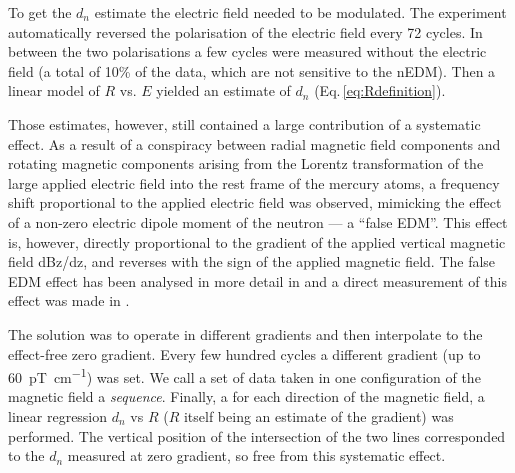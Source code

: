 To get the $d_n$ estimate the electric field needed to be modulated. The experiment automatically reversed the polarisation of the electric field every 72 cycles. In between the two polarisations a few cycles were measured without the electric field (a total of 10\% of the data, which are not sensitive to the nEDM). Then a linear model of  $R$ vs. $E$ yielded an estimate of $d_n$ (Eq.\,\ref{eq:Rdefinition}).

Those estimates, however, still contained a large contribution of a systematic effect. As a result of a conspiracy between radial magnetic field components and rotating magnetic components arising from the Lorentz transformation of the large applied electric field into the rest frame of the mercury atoms, a frequency shift proportional to the applied electric field was observed, mimicking the effect of a non-zero electric dipole moment of the neutron --- a “false EDM”. This effect is, however, directly proportional to the gradient of the applied vertical magnetic field dBz/dz, and reverses with the sign of the applied magnetic field. The false EDM effect has been analysed in more detail in  and a direct measurement of this effect was made in . 

The solution was to operate in different gradients and then interpolate to the effect-free zero gradient. Every few hundred cycles a different gradient (up to \SI{60}{\pico\tesla\per\centi\meter}) was set.
We call a set of data taken in one configuration of the magnetic field a \emph{sequence}. Finally, a for each direction of the magnetic field, a linear regression $d_n$ vs $R$ ($R$ itself being an estimate of the gradient) was performed. The vertical position of the intersection of the two lines corresponded to the $d_n$ measured at zero gradient, so free from this systematic effect.


